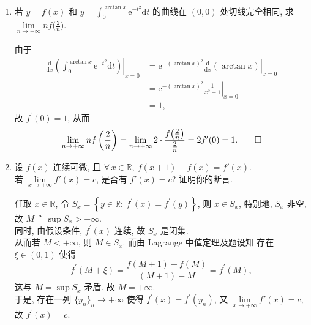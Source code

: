 \begin{enumerate}
\item[三、]
若 $y=f(x)$ 和 $y=\int_{0}^{\arctan x}\mathrm{e}^{-t^2}\mathrm{d}t$ 的曲线在 $(0,0)$ 处切线完全相同,
求 $\lim\limits_{n\to +\infty} nf\big( \frac{2}{n} \big)$. 
\begin{proofc}
    由于
    \begin{align*}
        \left.\frac{\mathrm{d}}{\mathrm{d}x} \left( \int_{0}^{\arctan x} \mathrm{e}^{-t^2} \mathrm{d}t \right) \right|_{x=0}
        &= \left. \mathrm{e}^{-\left(\arctan x\right)^2} \frac{\mathrm{d}}{\mathrm{d}x}\left( \arctan{x} \right) \right|_{x=0}\\
        &= \left. \mathrm{e}^{-\left(\arctan x\right)^2} \frac{1}{x^2+1} \right|_{x=0}\\
        &= 1,
    \end{align*}
    故 $f^\prime(0)=1$,
    从而
    $$\lim_{n\to +\infty} nf\left(\frac{2}{n}\right)
    = \lim_{n\to +\infty} 2 \cdot \frac{f\big( \frac{2}{n} \big)}{\frac{2}{n}}
    = 2 f^\prime(0)
    = 1. \qedhere$$
\end{proofc}

\item[四、]
设 $f(x)$ 连续可微,
且 $\forall\,x\in \mathbb{R},\ f(x+1)-f(x)=f'(x)$. \\
若 $\lim\limits_{x\to +\infty} f'(x)=c$,
是否有 $f'(x)=c$? 证明你的断言. 
\begin{proofc}
    任取 $x\in\mathbb{R}$,
    令 $S_x=\left\{ y\in\mathbb{R}:\ f^\prime(x) = f^\prime(y) \right\}$,
    则 $x\in S_x$,
    特别地, $S_x$ 非空,
    故 $M\triangleq \sup S_x > -\infty$. \\
    同时, 由假设条件, $f^\prime(x)$ 连续,
    故 $S_x$ 是闭集. \\
    从而若 $M<+\infty$,
    则 $M\in S_x$.
    而由 Lagrange 中值定理及题设知
    存在 $\xi \in (0,1)$ 使得 
    $$f^\prime(M+\xi) = \frac{f(M+1)-f(M)}{(M+1)-M}=f^\prime(M),$$
    这与 $M=\sup S_x$ 矛盾. 故 $M=+\infty$. \\
    于是, 存在一列 $\{ y_n \}_n \to +\infty$ 使得 $f^\prime(x)=f^\prime(y_n)$,
    又 $\lim\limits_{x\to +\infty} f'(x)=c$, 故 $f^\prime(x)=c$. 
\end{proofc}


\end{enumerate}
